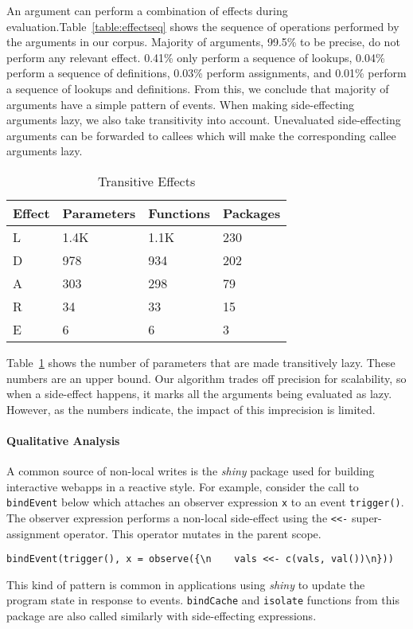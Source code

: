 \documentclass[review,nonacm,screen,acmsmall,anonymous=true]{acmart}
\newcommand{\code}[1]{\lstinline |#1|\xspace}
\begin{document}
An argument can perform a combination of effects during
evaluation.Table~\ref{table:effectseq} shows the sequence of operations
performed by the arguments in our corpus. Majority of arguments, 99.5\% to be
precise, do not perform any relevant effect. 0.41\% only perform a sequence of
lookups, 0.04\% perform a sequence of definitions, 0.03\% perform assignments,
and 0.01\% perform a sequence of lookups and definitions. From this, we conclude
that majority of arguments have a simple pattern of events.
%
When making side-effecting arguments lazy, we also take transitivity into
account. Unevaluated side-effecting arguments can be forwarded to callees which
will make the corresponding callee arguments lazy.
\begin{table}[!h]
  \vspace{-3mm}
  \small
  \caption{Transitive Effects} \label{table:transeffects}
  \centering
  \begin{tabular}{llll}
    \toprule
    \textbf{Effect}&\textbf{Parameters}&\textbf{Functions}&\textbf{Packages}\\
    \midrule
    L&1.4K&1.1K&230\\
    D&978&934&202\\
    A&303&298&79\\
    R&34&33&15\\
    E&6&6&3\\
    \bottomrule
  \end{tabular}
\end{table}
Table~\ref{table:transeffects} shows the number of parameters that are made
transitively lazy. These numbers are an upper bound. Our algorithm trades off
precision for scalability, so when a side-effect happens, it marks all the
arguments being evaluated as lazy. However, as the numbers indicate, the impact
of this imprecision is limited.

\paragraph{Qualitative Analysis}

A common source of non-local writes is the \emph{shiny} package used for
building interactive webapps in a reactive style. For example, consider the call
to \code{bindEvent} below which attaches an observer expression \code{x} to an
event \code{trigger()}. The observer expression performs a non-local side-effect
using the \code{<<-} super-assignment operator. This operator mutates in the
parent scope.
%
\begin{lstlisting}
bindEvent(trigger(), x = observe({\n    vals <<- c(vals, val())\n}))
\end{lstlisting}
%
This kind of pattern is common in applications using \emph{shiny} to update the
program state in response to events. \code{bindCache} and
\code{isolate} functions from this package are also called similarly with
side-effecting expressions.
\end{document}
